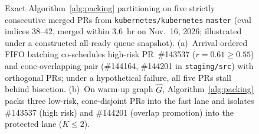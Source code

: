 \begin{figure}[t]
\caption{Exact Algorithm~\ref{alg:packing} partitioning on five strictly consecutive merged PRs from \texttt{kubernetes/kubernetes} \texttt{master} (eval indices 38--42, merged within 3.6~hr on Nov.~16, 2026; illustrated under a constructed all-ready queue snapshot). (a)~Arrival-ordered FIFO batching co-schedules high-risk PR~\#143537 ($r=0.61 \ge 0.55$) and cone-overlapping pair (\#144164, \#144201 in \texttt{staging/src}) with orthogonal PRs; under a hypothetical failure, all five PRs stall behind bisection. (b)~On warm-up graph $\hat{G}$, Algorithm~\ref{alg:packing} packs three low-risk, cone-disjoint PRs into the fast lane and isolates \#143537 (high risk) and \#144201 (overlap promotion) into the protected lane ($K \le 2$).}
\label{fig:motivating}
\end{figure}
